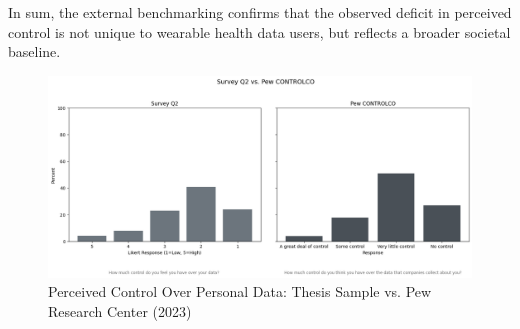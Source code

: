 		In sum, the external benchmarking confirms that the observed deficit in perceived control is not unique to wearable health data users, but reflects a broader societal baseline. 		
	\begin{figure}[ht]\centering
		\includegraphics[width=0.7\linewidth]{figures/img/pew_comparison_plots/compare_2_vs_CONTROLCO.png}
		\caption{Perceived Control Over Personal Data: Thesis Sample vs. Pew Research Center (2023)}
		\label{fig:pew_control_comparison}
	\end{figure}
